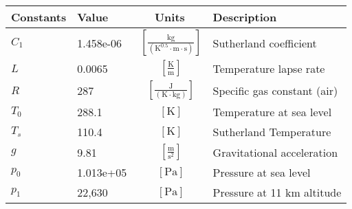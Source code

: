 % 

{\footnotesize
\begin{longtable}{llcl}
\toprule
Constants & Value & Units & Description \\ \midrule
$C_1$ & 1.458e-06  & $~\mathrm{[\tfrac{kg}{\left(K^{0.5}\cdot m\cdot s\right)}]}$ & Sutherland coefficient \\
$L$ & 0.0065  & $~\mathrm{[\tfrac{K}{m}]}$ & Temperature lapse rate \\
$R$ & 287  & $~\mathrm{[\tfrac{J}{\left(K\cdot kg\right)}]}$ & Specific gas constant (air) \\
$T_0$ & 288.1  & $~\mathrm{[K]}$ & Temperature at sea level \\
$T_s$ & 110.4  & $~\mathrm{[K]}$ & Sutherland Temperature \\
$g$ & 9.81  & $~\mathrm{[\tfrac{m}{s^2}]}$ & Gravitational acceleration \\
$p_0$ & 1.013e+05  & $~\mathrm{[Pa]}$ & Pressure at sea level \\
$p_1$ & 22,630& $~\mathrm{[Pa]}$ & Pressure at 11 km altitude\\
\bottomrule
\end{longtable}}

% 
